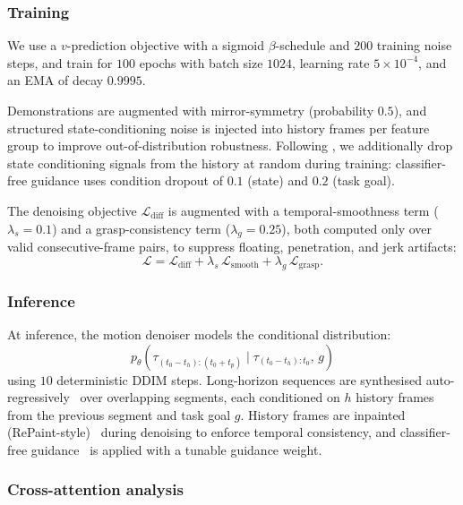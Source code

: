\documentclass{article}
\begin{document}
\subsubsection{Training}
\label{app:training}
We use a $v$-prediction objective with a sigmoid $\beta$-schedule and $200$ training noise steps, and train for $100$ epochs with batch size $1024$, learning rate $5\times10^{-4}$, and an EMA of decay $0.9995$.

Demonstrations are augmented with mirror-symmetry (probability $0.5$), and structured state-conditioning noise is injected into history frames per feature group to improve out-of-distribution robustness. Following \cite{tessler2024maskedmimicunifiedphysicsbasedcharacter}, we additionally drop state conditioning signals from the history at random during training: classifier-free guidance uses condition dropout of $0.1$ (state) and $0.2$ (task goal). 

The denoising objective $\mathcal{L}_{\mathrm{diff}}$ is augmented with a temporal-smoothness term ($\lambda_s = 0.1$) and a grasp-consistency term ($\lambda_g = 0.25$), both computed only over valid consecutive-frame pairs, to suppress floating, penetration, and jerk artifacts:
\[
\mathcal{L} = \mathcal{L}_{\mathrm{diff}} + \lambda_s\,\mathcal{L}_{\mathrm{smooth}} + \lambda_g\,\mathcal{L}_{\mathrm{grasp}}.
\]

\subsubsection{Inference}
\label{app:inference}
At inference, the motion denoiser models the conditional distribution:
\begin{equation} \label{eq:motion_generator_formulation}
    p_{\theta}(\tau_{(t_0-t_h):(t_0+t_p)} \mid \tau_{(t_0-t_h):t_0},\, g)
\end{equation}
using $10$ deterministic DDIM steps. Long-horizon sequences are synthesised auto-regressively~\cite{shi2024interactivecharactercontrolautoregressive, lin2025simgenhoi} over overlapping segments, each conditioned on $h$ history frames from the previous segment and task goal $g$. History frames are inpainted (RePaint-style)~\cite{lugmayr2022repaint} during denoising to enforce temporal consistency, and classifier-free guidance~\cite{ho2022classifierfreediffusionguidance} is applied with a tunable guidance weight.


\subsubsection{Cross-attention analysis}
\label{app:cross_attention}
\end{document}
